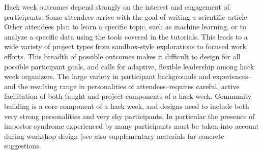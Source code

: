 Hack week outcomes depend strongly on the interest and engagement of participants.
Some attendees arrive with the goal of writing a scientific article.
Other attendees plan to learn a specific topic, such as machine learning, or to analyze a specific data using the tools covered in the tutorials.
This leads to a wide variety of project types from sandbox-style explorations to focused work efforts.
This breadth of possible outcomes makes it difficult to design for all possible participant goals, and calls for adaptive, flexible leadership among hack week organizers.
The large variety in participant backgrounds and experiences--and the resulting range in personalities of attendees--requires careful, active facilitation of both taught and project components of a hack week. Community building is a core component of a hack week, and designs need to include both very strong personalities and very shy participants. In particular the presence of impostor syndrome experienced by many participants must be taken into account during workshop design (see also supplementary materials for concrete suggestions.
